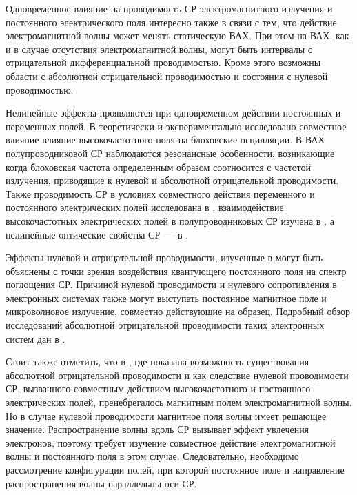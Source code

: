 Одновременное влияние на проводимость СР электромагнитного излучения и постоянного электрического поля интересно также в связи с тем, что действие электромагнитной волны может менять статическую ВАХ. При этом на ВАХ, как и в случае отсутствия электромагнитной волны, могут быть интервалы с отрицательной дифференциальной проводимостью. Кроме этого возможны области с абсолютной отрицательной проводимостью и состояния с нулевой проводимостью.

Нелинейные эффекты проявляются при одновременном действии постоянных и переменных полей. В \cite{unterrainer} теоретически и экспериментально исследовано совместное влияние влияние высокочастотного поля на блоховские осцилляции. В ВАХ полупроводниковой СР наблюдаются резонансные особенности, возникающие когда блоховская частота определенным образом соотносится с частотой излучения, приводящие к нулевой и абсолютной отрицательной проводимости. Также проводимость СР в условиях совместного действия переменного и постоянного электрических полей исследована в \cite{mensah2}, взаимодействие высокочастотных электрических полей в полупроводниковых СР изучена в \cite{bass}, а нелинейные оптические свойства СР~--- в \cite{ghosh}.

Эффекты нулевой и отрицательной проводимости, изученные в \cite{unterrainer} могут быть объяснены с точки зрения воздействия квантующего постоянного поля на спектр поглощения СР. Причиной нулевой проводимости и нулевого сопротивления в электронных системах также могут выступать постоянное магнитное поле и микроволновое излучение, совместно действующие на образец. Подробный обзор исследований абсолютной отрицательной проводимости таких электронных систем дан в \cite{red}.

Стоит также отметить, что в \cite{unterrainer}, где показана возможность существования абсолютной отрицательной проводимости и как следствие нулевой проводимости СР, вызванного совместным действием высокочастотного и постоянного электрических полей, пренебрегалось магнитным полем электромагнитной волны. Но в случае нулевой проводимости магнитное поля волны имеет решающее значение. Распространение волны вдоль СР вызывает эффект увлечения электронов, поэтому требует изучение совместное действие электромагнитной волны и постоянного поля в этом случае. Следовательно, необходимо рассмотрение конфигурации полей, при которой постоянное поле и направление распространения волны параллельны оси СР.

